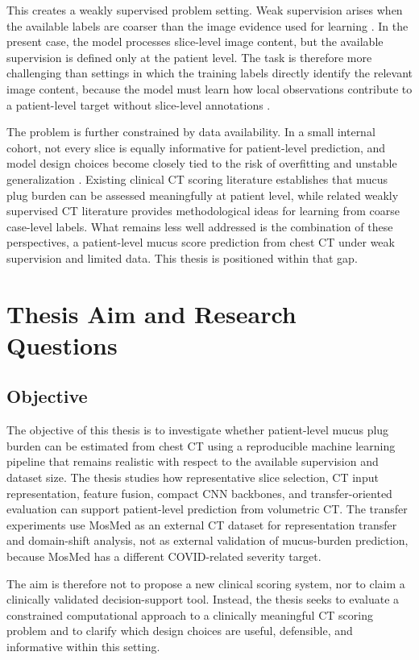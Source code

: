 This creates a weakly supervised problem setting. Weak supervision arises when the available labels are coarser than the image evidence used for learning \cite{ren2023weakly}. In the present case, the model processes slice-level image content, but the available supervision is defined only at the patient level. The task is therefore more challenging than settings in which the training labels directly identify the relevant image content, because the model must learn how local observations contribute to a patient-level target without slice-level annotations \cite{ren2023weakly,qi2021drmil}.

The problem is further constrained by data availability. In a small internal cohort, not every slice is equally informative for patient-level prediction, and model design choices become closely tied to the risk of overfitting and unstable generalization \cite{dhiman2023samplesize}. Existing clinical CT scoring literature establishes that mucus plug burden can be assessed meaningfully at patient level, while related weakly supervised CT literature provides methodological ideas for learning from coarse case-level labels. What remains less well addressed is the combination of these perspectives, a patient-level mucus score prediction from chest CT under weak supervision and limited data. This thesis is positioned within that gap.


\section{Thesis Aim and Research Questions}

\subsection{Objective}
The objective of this thesis is to investigate whether patient-level mucus plug burden can be estimated from chest CT using a reproducible machine learning pipeline that remains realistic with respect to the available supervision and dataset size. The thesis studies how representative slice selection, CT input representation, feature fusion, compact CNN backbones, and transfer-oriented evaluation can support patient-level prediction from volumetric CT. The transfer experiments use MosMed as an external CT dataset for representation transfer and domain-shift analysis, not as external validation of mucus-burden prediction, because MosMed has a different COVID-related severity target.

The aim is therefore not to propose a new clinical scoring system, nor to claim a clinically validated decision-support tool. Instead, the thesis seeks to evaluate a constrained computational approach to a clinically meaningful CT scoring problem and to clarify which design choices are useful, defensible, and informative within this setting.


